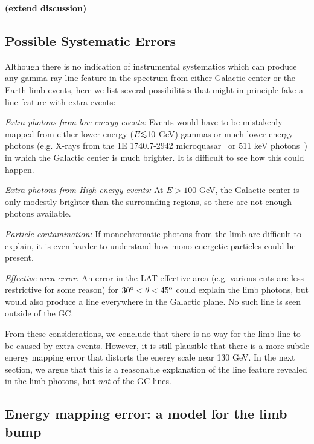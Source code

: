 \documentclass[aps,twocolumn,prd,superscriptaddress,showpacs,nofootinbib,fixfloat]{revtex4}
\newcommand{\degree}{^{\rm o}}
\def\la{\vcenter{\hbox{$<$}\offinterlineskip\hbox{$\sim$}}}
\begin{document}
\textbf{(extend discussion)}

\subsection{Possible Systematic Errors}

Although there is no indication of instrumental systematics
which can produce any gamma-ray line feature in the spectrum
from either Galactic center or the Earth limb events, here
we list several possibilities that might in principle fake a
line feature with extra events:

{\it Extra photons from low energy events:} Events would
have to be mistakenly mapped from either lower energy ($E
\la 10$ GeV) gammas or much lower energy photons (e.g.
X-rays from the 1E 1740.7-2942 microquasar~\cite{Gallo:2002}
or 511 keV photons~\cite{Prantzos:2011}) in which the
Galactic center is much brighter.  It is difficult to see
how this could happen.

{\it Extra photons from High energy events:} At $E > 100$
GeV, the Galactic center is only modestly brighter than the
surrounding regions, so there are not enough photons
available.

{\it Particle contamination:} If monochromatic photons from
the limb are difficult to explain, it is even harder to
understand how mono-energetic particles could be present.

{\it Effective area error:} An error in the LAT effective
area (e.g. various cuts are less restrictive for some
reason) for $30\degree < \theta < 45\degree$ could explain
the limb photons, but would also produce a line everywhere
in the Galactic plane.  No such line is seen outside of the
GC.\medskip

From these considerations, we conclude that there is no way
for the limb line to be caused by extra events. However, it
is still plausible that there is a more subtle energy
mapping error that distorts the energy scale near 130 GeV.
In the next section, we argue that this is a reasonable
explanation of the line feature revealed in the limb
photons, but {\em not} of the GC lines. 

\subsection{Energy mapping error: a model for the limb bump}

 
\end{document}
